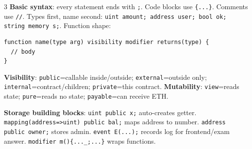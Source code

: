 \documentclass[8pt]{extarticle}
\newcommand{\term}[1]{\textbf{#1}}
\begin{document}
\begin{multicols*}{3}
\term{Basic syntax}: every statement ends with \texttt{;}. Code blocks use \texttt{\{...\}}. Comments use \texttt{//}. Types first, name second: \texttt{uint amount; address user; bool ok; string memory s;}. Function shape:
\begin{verbatim}
function name(type arg) visibility modifier returns(type) {
  // body
}
\end{verbatim}
\term{Visibility}: \texttt{public}=callable inside/outside; \texttt{external}=outside only; \texttt{internal}=contract/children; \texttt{private}=this contract. \term{Mutability}: \texttt{view}=reads state; \texttt{pure}=reads no state; \texttt{payable}=can receive ETH.

\term{Storage building blocks}: \texttt{uint public x;} auto-creates getter. \texttt{mapping(address=>uint) public bal;} maps address to number. \texttt{address public owner;} stores admin. \texttt{event E(...);} records log for frontend/exam answer. \texttt{modifier m()\{...\_;...\}} wraps functions.


\end{multicols*}
\end{document}
